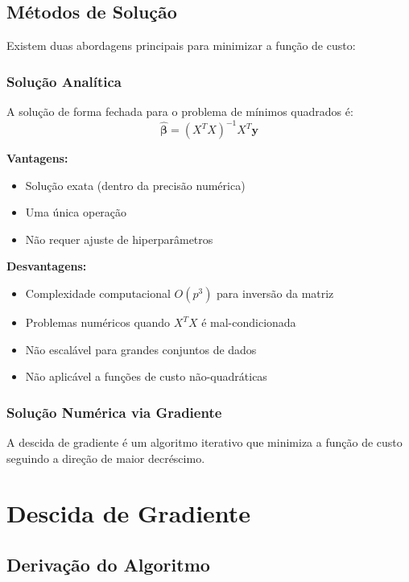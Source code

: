 \documentclass[a4paper,12pt]{article}
\begin{document}
\subsection{Métodos de Solução}

Existem duas abordagens principais para minimizar a função de custo:

\subsubsection{Solução Analítica}
A solução de forma fechada para o problema de mínimos quadrados é:
\begin{equation}
    \hat{\boldsymbol{\beta}} = (X^TX)^{-1}X^T\mathbf{y}
    \label{eq:solucao_analitica}
\end{equation}

\textbf{Vantagens:}
\begin{itemize}
    \item Solução exata (dentro da precisão numérica)
    \item Uma única operação
    \item Não requer ajuste de hiperparâmetros
\end{itemize}

\textbf{Desvantagens:}
\begin{itemize}
    \item Complexidade computacional $O(p^3)$ para inversão da matriz
    \item Problemas numéricos quando $X^TX$ é mal-condicionada
    \item Não escalável para grandes conjuntos de dados
    \item Não aplicável a funções de custo não-quadráticas
\end{itemize}

\subsubsection{Solução Numérica via Gradiente}
A descida de gradiente é um algoritmo iterativo que minimiza a função de custo seguindo a direção de maior decréscimo.

\section{Descida de Gradiente}

\subsection{Derivação do Algoritmo}
\end{document}
